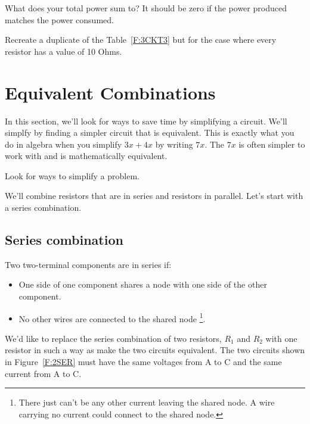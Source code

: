 \begin{clevel}
What does your total power sum to? It should be zero if the power produced matches the power consumed.
\end{clevel}

\begin{clevel}
Recreate a duplicate of the Table~\ref{F:3CKT3} but for the case where every resistor has a value of 10 Ohms.
\end{clevel}

\section{Equivalent Combinations}
In this section, we'll look for ways to save time by simplifying a circuit. We'll simplfy by finding a simpler circuit that is equivalent. This is exactly what you do in algebra when you simplify $3x+4x$ by writing $7x$. The $7x$ is often simpler to work with and is mathematically equivalent.

\begin{bigidea}
Look for ways to simplify a problem.
\end{bigidea}

We'll combine resistors that are in series and resistors in parallel. Let's start with a series combination. 
\par

\subsection{Series combination}
Two two-terminal components are in series if:
\begin{itemize}
\item One side of one component shares a node with one side of the other component.
\item No other wires are connected to the shared node \footnote{There just can't be any other current leaving the shared node. A wire carrying no current could connect to the shared node.}.
\end{itemize}

We'd like to replace the series combination of two resistors, $R_1$ and $R_2$ with one resistor in such a way as make the two circuits equivalent. The two circuits shown in Figure~\ref{F:2SER} must have the same voltages from A to C and the same current from A to C.

